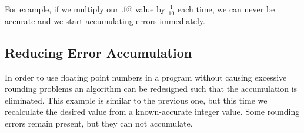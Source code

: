 For example, if we multiply our \verb@x.f@ value by $\frac{1}{10}$ each time, 
we can never be accurate and we start accumulating errors immediately.


\subsection{Reducing Error Accumulation} 
In order to use floating point numbers in a program without causing 
excessive rounding problems an algorithm can be redesigned such that the 
accumulation is eliminated.  
This example is similar to the previous one, but this time we recalculate the 
desired value from a known-accurate integer value.  
Some rounding errors remain present, but they can not accumulate.

